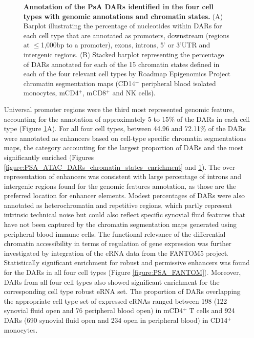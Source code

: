 \begin{figure}[htbp]
\begin{subfigure}[b]{0.75\textwidth}
\caption{}
\end{subfigure}
\caption[Annotation of the PsA DARs identified in the four cell types with genomic annotations and chromatin states.]{\textbf{Annotation of the PsA DARs identified in the four cell types with genomic annotations and chromatin states.} (A) Barplot illustrating the percentage of nucleotides within DARs for each cell type that are annotated as promoters, downstream (regions at $\leq$1,000bp to a promoter), exons, introns, 5' or 3'UTR and intergenic regions. (B) Stacked barplot representing the percentage of DARs annotated for each of the 15 chromatin states defined in each of the four relevant cell types by Roadmap Epigenomics Project chromatin segmentation maps (CD14$^+$ peripheral blood isolated monocytes, mCD4$^+$, mCD8$^+$ and NK cells).}
\label{figure:PsA_FAST_ATAC_DOCS_annotation}
\end{figure}

Universal promoter regions were the third most represented genomic feature, accounting for the annotation of approximately 5 to 15\% of the DARs in each cell type (Figure \ref{figure:PsA_FAST_ATAC_DOCS_annotation}A). For all four cell types, between 44.96 and 72.11\% of the DARs were annotated as enhancers based on cell-type specific chromatin segmentations maps, the category accounting for the largest proportion of DARs and the most significantly enriched (Figures \ref{figure:PSA_ATAC_DARs_chromatin_states_enrichment} and \ref{figure:PsA_FAST_ATAC_DOCS_annotation}). The over-representation of enhancers was consistent with large percentage of introns and intergenic regions found for the genomic features annotation, as those are the preferred location for enhancer elements. Modest percentages of DARs were also annotated as heterochromatin and repetitive regions, which partly represent intrinsic technical noise but could also reflect specific synovial fluid features that have not been captured by the chromatin segmentation maps generated using peripheral blood immune cells.
%
The functional relevance of the differential chromatin accessibility in terms of regulation of gene expression was further investigated by integration of the eRNA data from the FANTOM5 project. Statistically significant enrichment for robust and permissive enhancers was found for the DARs in all four cell types (Figure \ref{figure:PSA_FANTOM}).  Moreover, DARs from all four cell types also showed significant enrichment for the corresponding cell type robust eRNA set. The proportion of DARs overlapping the appropriate cell type set of expressed eRNAs ranged between 198 (122 synovial fluid open and 76 peripheral blood open) in mCD4$^+$ T cells and 924 DARs (690 synovial fluid open and 234 open in peripheral blood) in CD14$^+$ monocytes.


